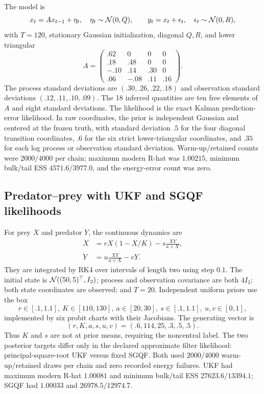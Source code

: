 The model is
\begin{equation}
 x_t=Ax_{t-1}+\eta_t,\quad \eta_t\sim\mathcal{N}(0,Q),\qquad
 y_t=x_t+\epsilon_t,\quad \epsilon_t\sim\mathcal{N}(0,R),
\end{equation}
with $T=120$, stationary Gaussian initialization, diagonal $Q,R$, and lower
triangular
\begin{equation}
 A=\begin{pmatrix}.62&0&0&0\\.18&.48&0&0\\-.10&.14&.30&0\\
 .06&-.08&.11&.16\end{pmatrix}.
\end{equation}
The process standard deviations are $(.30,.26,.22,.18)$ and observation
standard deviations $(.12,.11,.10,.09)$.  The 18 inferred quantities are ten
free elements of $A$ and eight standard deviations.  The likelihood is the
exact Kalman prediction-error likelihood.  In raw coordinates, the prior is
independent Gaussian and centered at the frozen truth, with standard deviation
$.5$ for the four diagonal transition coordinates, $.6$ for the six strict
lower-triangular coordinates, and $.35$ for each log process or observation
standard deviation.  Warm-up/retained counts were
$2000/4000$ per chain; maximum modern R-hat was $1.00215$, minimum bulk/tail
ESS $4571.6/3977.0$, and the energy-error count was zero.

\subsection{Predator--prey with UKF and SGQF likelihoods}

For prey $X$ and predator $Y$, the continuous dynamics are
\begin{align}
 \dot X&=rX(1-X/K)-s\frac{XY}{a+X},\\
 \dot Y&=u\frac{XY}{a+X}-vY.
\end{align}
They are integrated by RK4 over intervals of length two using step $0.1$.
The initial state is $\mathcal{N}((50,5)^\top,I_2)$; process and observation covariance
are both $4I_2$; both state coordinates are observed; and $T=20$.  Independent
uniform priors use the box
\begin{equation}
 r\in[.1,1.1],\ K\in[110,130],\ a\in[20,30],\ s\in[.1,1.1],\
 u,v\in[0,1],
\end{equation}
implemented by six probit charts with their Jacobians.  The generating vector
is
\begin{equation}
 (r,K,a,s,u,v)=(.6,114,25,.3,.5,.5).
\end{equation}
Thus $K$ and $s$ are not at prior means, requiring
the noncentral label.  The two posterior targets differ only in the declared
approximate filter likelihood: principal-square-root UKF versus fixed SGQF.
Both used $2000/4000$ warm-up/retained draws per chain and zero recorded energy
failures.  UKF had maximum modern R-hat $1.00081$ and minimum bulk/tail ESS
$27623.6/13394.1$; SGQF had $1.00033$ and $26978.5/12974.7$.

